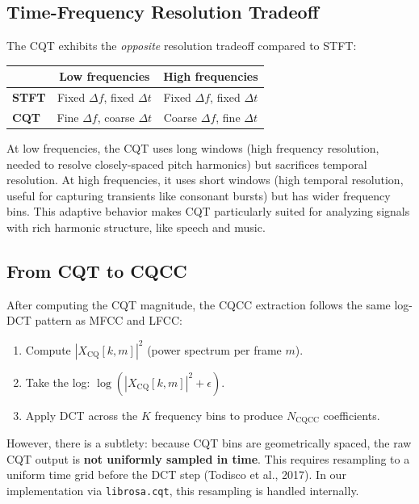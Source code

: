 \documentclass[12pt]{report}
\begin{document}
\subsection{Time-Frequency Resolution Tradeoff}

The CQT exhibits the \emph{opposite} resolution tradeoff compared to STFT:
\begin{center}
\begin{tabular}{lcc}
\toprule
& \textbf{Low frequencies} & \textbf{High frequencies} \\
\midrule
\textbf{STFT} & Fixed $\Delta f$, fixed $\Delta t$ & Fixed $\Delta f$, fixed $\Delta t$ \\
\textbf{CQT}  & Fine $\Delta f$, coarse $\Delta t$ & Coarse $\Delta f$, fine $\Delta t$ \\
\bottomrule
\end{tabular}
\end{center}

At low frequencies, the CQT uses long windows (high frequency resolution, needed to resolve
closely-spaced pitch harmonics) but sacrifices temporal resolution. At high frequencies, it uses
short windows (high temporal resolution, useful for capturing transients like consonant bursts)
but has wider frequency bins. This adaptive behavior makes CQT particularly suited for analyzing
signals with rich harmonic structure, like speech and music.

\subsection{From CQT to CQCC}

After computing the CQT magnitude, the CQCC extraction follows the same log-DCT pattern as
MFCC and LFCC:
\begin{enumerate}[noitemsep]
    \item Compute $|X_\text{CQ}[k,m]|^2$ (power spectrum per frame $m$).
    \item Take the log: $\log(|X_\text{CQ}[k,m]|^2 + \epsilon)$.
    \item Apply DCT across the $K$ frequency bins to produce $N_\text{CQCC}$ coefficients.
\end{enumerate}

However, there is a subtlety: because CQT bins are geometrically spaced, the raw CQT output
is \textbf{not uniformly sampled in time}. This requires resampling to a uniform time grid
before the DCT step (Todisco et al., 2017). In our implementation via \texttt{librosa.cqt},
this resampling is handled internally.
\end{document}
